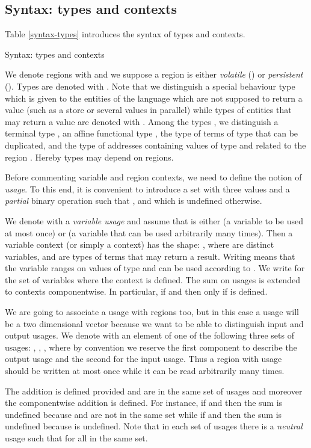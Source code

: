 \documentclass[11pt]{article}
\begin{document}
\subsection{Syntax: types and contexts}
Table \ref{syntax-types} introduces the syntax of types and contexts.
\begin{table}
{\footnotesize
}
\caption{Syntax: types and contexts}\label{syntax-types}
\end{table}
We denote regions with  and we suppose a region 
is either {\em volatile} () or {\em persistent} ().
Types are denoted with . Note that we distinguish a
special behaviour type  which is given to the entities of
the language which are
not supposed to return a value  (such as a store or several values in parallel)
while types of entities that may return a value are denoted with .
Among the types , we distinguish a terminal type , 
an affine functional type , the type  of terms of type 
that can be duplicated, and the type  of 
addresses containing values of type 
and related to the region . Hereby types may depend on regions.

Before commenting variable and region contexts, we need to define the notion of {\em usage}.
To this end, it is convenient to introduce a set with three values 
 and a {\em partial} binary operation  such
that ,  and which
is undefined otherwise.

We denote with  a {\em variable usage} and assume that  is either  (a variable to be used
at most once) or  (a variable that can be used arbitrarily many times).
Then a variable context (or simply a context)  has the  shape:
,
where  are distinct variables,  and  are types of
terms that may return a result. Writing  means that the variable 
 ranges on values of type  and can be used according to .
We  write  for the set  of
variables where the context is defined.
The sum on usages is extended to contexts componentwise.
In particular, if   and  then
 only if 
 is defined.

We are going to associate a usage with regions too, but in this case a usage
will be a two dimensional vector because we want to be able to distinguish
input and output usages. We denote with  an element of one of the following
three sets of usages:
,
,
,
where by convention we reserve the first component to describe the
output usage and the second for the input usage. Thus a region with usage
 should be written at most once while it can be 
read arbitrarily many times. 

The addition  is defined provided  and  are in the same set of usages and 
moreover the componentwise addition is defined. 
For instance, if  and  then the sum is undefined
because  and  are not in the same set while if  and
 then the sum is undefined because  is undefined.
Note that in each set of usages there is
a {\em neutral} usage  such that  for all  in the same set.
\end{document}
